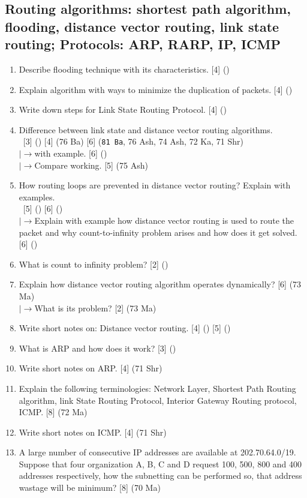 \documentclass[12pt]{article}
\newcommand{\lb}{\\$\left|\rightarrow\right.$}
\newcommand{\enter}{\\\textcolor{white}{1}}
\begin{document}
	\subsection{Routing algorithms: shortest path algorithm, flooding, distance vector routing, link state routing; Protocols: ARP, RARP, IP, ICMP}
		\begin{enumerate}[noitemsep, topsep=0pt]
			\item Describe flooding technique with its characteristics. \hfill [4] ()

			\item Explain algorithm with ways to minimize the duplication of packets. \hfill [4] ()

			\item Write down steps for Link State Routing Protocol. \hfill [4] ()

			\item Difference between link state and distance vector routing algorithms.
			\enter\hfill [3] () [4] (76 Ba) [6] (\texttt{81 Ba}, 76 Ash, 74 Ash, 72 Ka, 71 Shr)
			\lb with example. \hfill [6] ()
			\lb Compare working. \hfill [5] (75 Ash)

			\item How routing loops are prevented in distance vector routing? Explain with examples. 
			\enter\hfill [5] () [6] ()
			\lb Explain with example how distance vector routing is used to route the packet and why count-to-infinity problem arises and how does it get solved. \hspace{5.5cm} [6] ()

			\item What is count to infinity problem? \hfill [2] ()

			\item Explain how distance vector routing algorithm operates dynamically? \hfill [6] (73 Ma)
			\lb What is its problem? \hfill [2] (73 Ma)
			
			\item Write short notes on: Distance vector routing. \hfill [4] () [5] ()

			\item What is ARP and how does it work? \hfill [3] ()

			\item Write short notes on ARP. \hfill [4] (71 Shr)

			\item Explain the following terminologies: Network Layer, Shortest Path Routing algorithm, link State Routing Protocol, Interior Gateway Routing protocol, ICMP. \hfill [8] (72 Ma)

			\item Write short notes on ICMP. \hfill [4] (71 Shr)

			\item A large number of consecutive IP addresses are available at 202.70.64.0/19. Suppose that four organization A, B, C and D request 100, 500, 800 and 400 addresses respectively, how the subnetting can be performed so, that address wastage will be minimum? \hfill [8] (70 Ma)
		\end{enumerate}
\end{document}
